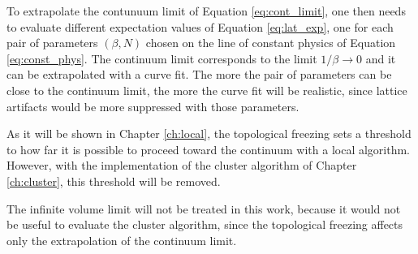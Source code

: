 To extrapolate the contunuum limit of Equation \eqref{eq:cont_limit},
one then needs to evaluate different expectation values of Equation \eqref{eq:lat_exp},
one for each pair of parameters $(\beta,N)$ chosen on the line of constant physics of Equation \eqref{eq:const_phys}.
The continuum limit corresponds to the limit $1/\beta\to0$ and it can be extrapolated with a curve fit.
The more the pair of parameters can be close to the continuum limit, the more the curve fit will be realistic,
since lattice artifacts would be more suppressed with those parameters. 

As it will be shown in Chapter \ref{ch:local}, the topological freezing sets a threshold to how far it is possible to proceed toward the continuum with a local algorithm.
However, with the implementation of the cluster algorithm of Chapter \ref{ch:cluster}, this threshold will be removed.

The infinite volume limit will not be treated in this work,
because it would not be useful to evaluate the cluster algorithm,
since the topological freezing affects only the extrapolation of the continuum limit.

